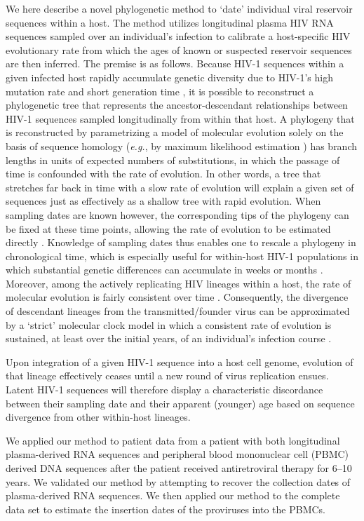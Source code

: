 \documentclass[12pt,onecolumn,twoside]{pnas-new}
\begin{document}
We here describe a novel phylogenetic method to `date' individual viral reservoir sequences within a host.
The method utilizes longitudinal plasma HIV RNA sequences sampled over an individual's infection to calibrate a host-specific HIV evolutionary rate from which the ages of known or suspected reservoir sequences are then inferred. The premise is as follows.
Because HIV-1 sequences within a given infected host rapidly accumulate genetic diversity due to HIV-1's high mutation rate and short generation time \cite{Alizon13,Rambaut04,Shankarappa99}, it is possible to reconstruct a phylogenetic tree that represents the ancestor-descendant relationships between HIV-1 sequences sampled longitudinally from within that host.
A phylogeny that is reconstructed by parametrizing a model of molecular evolution solely on the basis of sequence homology (\emph{e.g.}, by maximum likelihood estimation \cite{Felsenstein81}) has branch lengths in units of expected numbers of substitutions, in which the passage of time is confounded with the rate of evolution.
In other words, a tree that stretches far back in time with a slow rate of evolution will explain a given set of sequences just as effectively as a shallow tree with rapid evolution.
When sampling dates are known however, the corresponding tips of the phylogeny can be fixed at these time points, allowing the rate of evolution to be estimated directly \cite{Rodrigo99}.
Knowledge of sampling dates thus enables one to rescale a phylogeny in chronological time, which is especially useful for within-host HIV-1 populations in which substantial genetic differences can accumulate in weeks or months \cite{Williamson03}.
Moreover, among the actively replicating HIV lineages within a host, the rate of molecular evolution is fairly consistent over time \cite{Korber00,Kuhner95,Leitner99,Park16}.
Consequently, the divergence of descendant lineages from the transmitted/founder virus can be approximated by a `strict' molecular clock model in which a consistent rate of evolution is sustained, at least over the initial years, of an individual's infection course \cite{Keele08}. 

Upon integration of a given HIV-1 sequence into a host cell genome, evolution of that lineage effectively ceases until a new round of virus replication ensues.
Latent HIV-1 sequences will therefore display a characteristic discordance between their sampling date and their apparent (younger) age based on sequence divergence from other within-host lineages.

We applied our method to patient data from a patient with both longitudinal plasma-derived RNA sequences and peripheral blood mononuclear cell (PBMC) derived DNA sequences after the patient received antiretroviral therapy for 6--10 years.
We validated our method by attempting to recover the collection dates of plasma-derived RNA sequences.
We then applied our method to the complete data set to estimate the insertion dates of the proviruses into the PBMCs.
\end{document}
